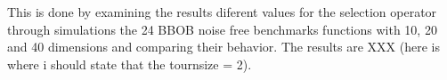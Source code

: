  This is done by examining the results diferent values for the selection operator through simulations the 24 BBOB noise free benchmarks functions with 10, 20 and 40 dimensions and comparing their behavior. The results are XXX (here is where i should state that the tournsize = 2).